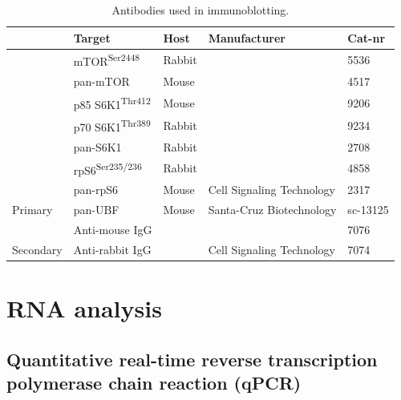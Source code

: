 \documentclass[twoside,10pt]{gihclass} %
\begin{document}
\begin{table}

\caption{\label{tab:primary-antibodies-table}Antibodies used in immunoblotting.}
\centering
\fontsize{7}{9}\selectfont
\begin{tabular}[t]{lllll}
\toprule
 & Target & Host & Manufacturer & Cat-nr\\
\midrule
 & mTOR\textsuperscript{Ser2448} & Rabbit &  & 5536\\

 & pan-mTOR & Mouse &  & 4517\\

 & p85 S6K1\textsuperscript{Thr412} & Mouse &  & 9206\\

 & p70 S6K1\textsuperscript{Thr389} & Rabbit &  & 9234\\

 & pan-S6K1 & Rabbit &  & 2708\\

 & rpS6\textsuperscript{Ser235/236} & Rabbit &  & 4858\\

 & pan-rpS6 & Mouse & \multirow{-7}{*}{\raggedright\arraybackslash Cell Signaling Technology} & 2317\\

\multirow{-8}{*}{\raggedright\arraybackslash Primary} & pan-UBF & Mouse & Santa-Cruz Biotechnology & sc-13125\\
\cmidrule{1-5}
 & Anti-mouse IgG &  &  & 7076\\

\multirow{-2}{*}{\raggedright\arraybackslash Secondary} & Anti-rabbit IgG &  & \multirow{-2}{*}{\raggedright\arraybackslash Cell Signaling Technology} & 7074\\
\bottomrule
\end{tabular}
\end{table}
\hypertarget{rna-analysis}{%
\section{RNA analysis}\label{rna-analysis}}

\hypertarget{quantitative-real-time-reverse-transcription-polymerase-chain-reaction-qpcr}{%
\subsection{Quantitative real-time reverse transcription polymerase chain reaction (qPCR)}\label{quantitative-real-time-reverse-transcription-polymerase-chain-reaction-qpcr}}
\end{document}
